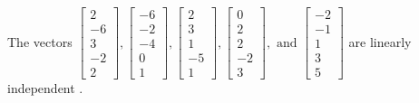\begin{exercise}
\begin{exerciseStatement}
  \end{exerciseStatement}
  \begin{exerciseAnswer}
   The vectors \(\left[\begin{array}{r}
2 \\
-6 \\
3 \\
-2 \\
2
\end{array}\right] , \left[\begin{array}{r}
-6 \\
-2 \\
-4 \\
0 \\
1
\end{array}\right] , \left[\begin{array}{r}
2 \\
3 \\
1 \\
-5 \\
1
\end{array}\right] , \left[\begin{array}{r}
0 \\
2 \\
2 \\
-2 \\
3
\end{array}\right] , \text{ and } \left[\begin{array}{r}
-2 \\
-1 \\
1 \\
3 \\
5
\end{array}\right]\) are 
  	 linearly independent  .
  


  \end{exerciseAnswer}
\end{exercise}